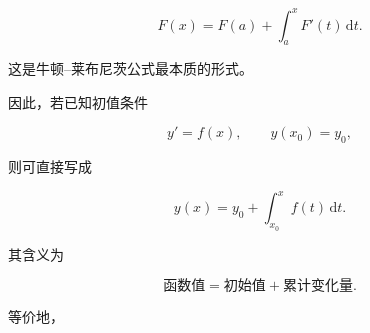 \documentclass[../book.tex]{subfiles}
\begin{document}
\begin{enumerate}
\begin{analysisbox}
            \[
                \boxed{
                    F(x)
                    =
                    F(a)
                    +
                    \int_a^x F'(t)\,\mathrm{d}t.
                }
            \]

            这是牛顿--莱布尼茨公式最本质的形式。

            \vspace{0.5em}

            因此，若已知初值条件

            \[
                y'=f(x),
                \qquad
                y(x_0)=y_0,
            \]

            则可直接写成

            \[
                \boxed{
                    y(x)
                    =
                    y_0
                    +
                    \int_{x_0}^{x} f(t)\,\mathrm{d}t.
                }
            \]

            其含义为

            \[
                \boxed{
                    \text{函数值}
                    =
                    \text{初始值}
                    +
                    \text{累计变化量}.
                }
            \]

            等价地，


\end{analysisbox}
\end{enumerate}
\end{document}
